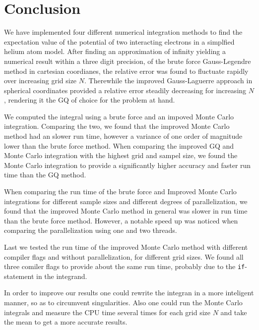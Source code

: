 \documentclass[10pt, twocolumn]{aastex62}
\begin{document}
\section{Conclusion} \label{sec:conclusion}
We have implemented four different numerical integration methods to find the
expectation value of the potential of two interacting electrons in a simplfied
helium atom model. After finding an approximation of infinity yielding a
numerical result within a three digit precision, of the brute force
Gauss-Legendre method in cartesian coordianes, the relative error was found to
fluctuate rapidly over increasing grid size $N$. Therewhile the improved
Gauss-Laguerre approach in spherical coordinates provided a relative error
steadily decreasing for increasing $N$, rendering it the GQ of choice for the
problem at hand. 

We computed the integral using a brute force and an impoved Monte Carlo
integration. Comparing the two, we found that the improved Monte Carlo method
had an slower run time, however a variance of one order of magnitude lower than
the brute force method. When comparing the improved GQ and Monte Carlo
integration with the highest grid and sampel size, we found the Monte Carlo
integration to provide a significantly higher accuracy and faster run time than
the GQ method.

When comparing the run time of the brute force and Improved Monte Carlo
integrations for different sample sizes and different degrees of
parallelization, we found that the improved Monte Carlo method in general was
slower in run time than the brute force method. However, a notable speed up was
noticed when comparing the parallelization using one and two threads.

Last we tested the run time of the improved Monte Carlo method with different
compiler flags and without parallelization, for different grid sizes. We found
all three comiler flags to provide about the same run time, probably due to the
\texttt{if}-statement in the integrand.

In order to improve our results one could rewrite the integran in a more
inteligent manner, so as to circumvent singularities. Also one could run the
Monte Carlo integrals and measure the CPU time several times for each grid size
$N$ and take the mean to get a more accurate results.



\prntlen{\textwidth}
\nocite{jensen:2019}


\end{document}
